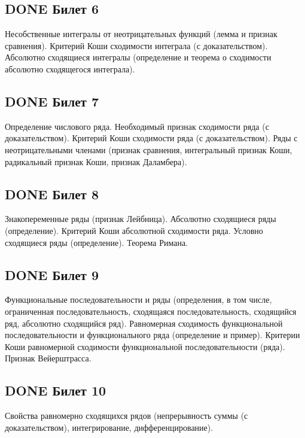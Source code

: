 \documentclass[11pt]{article}
\begin{document}
\subsection{{\bfseries\sffamily DONE} Билет 6}
\label{sec:orgf93c7be}
Несобственные интегралы от неотрицательных функций (лемма и признак сравнения). Критерий Коши сходимости интеграла (с доказательством). Абсолютно сходящиеся интегралы (определение и теорема о сходимости абсолютно сходящегося интеграла).

\subsection{{\bfseries\sffamily DONE} Билет 7}
\label{sec:orgae14c21}
Определение числового ряда. Необходимый признак сходимости ряда (с доказательством). Критерий Коши сходимости ряда (с доказательством). Ряды с неотрицательными членами (признак сравнения, интегральный признак Коши, радикальный признак Коши, признак Даламбера).


\subsection{{\bfseries\sffamily DONE} Билет 8}
\label{sec:org64b1c5f}
Знакопеременные ряды (признак Лейбница). Абсолютно сходящиеся ряды (определение). Критерий Коши абсолютной сходимости ряда. Условно сходящиеся ряды (определение). Теорема Римана.


\subsection{{\bfseries\sffamily DONE} Билет 9}
\label{sec:org5a47b4c}
Функциональные последовательности  и ряды (определения, в том числе, ограниченная последовательность, сходящаяся последовательность, сходящийся ряд, абсолютно сходящийся ряд). Равномерная сходимость функциональной последовательности и функционального ряда (определение и пример). Критерии Коши равномерной сходимости функциональной последовательности (ряда). Признак Вейерштрасса.


\subsection{{\bfseries\sffamily DONE} Билет 10}
\label{sec:orge8f935a}
Свойства равномерно сходящихся рядов (непрерывность суммы (с доказательством), интегрирование, дифференцирование).

\end{document}
